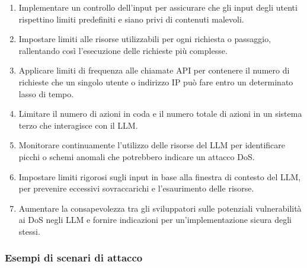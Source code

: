 \documentclass[
]{article}
\providecommand{\tightlist}{%
  \setlength{\itemsep}{0pt}\setlength{\parskip}{0pt}}
\begin{document}
\begin{enumerate}
\def\labelenumi{\arabic{enumi}.}
\tightlist
\item
  Implementare un controllo dell'input per assicurare che gli input
  degli utenti rispettino limiti predefiniti e siano privi di contenuti
  malevoli.
\item
  Impostare limiti alle risorse utilizzabili per ogni richiesta o
  passaggio, rallentando così l'esecuzione delle richieste più
  complesse.
\item
  Applicare limiti di frequenza alle chiamate API per contenere il
  numero di richieste che un singolo utente o indirizzo IP può fare
  entro un determinato lasso di tempo.
\item
  Limitare il numero di azioni in coda e il numero totale di azioni in
  un sistema terzo che interagisce con il LLM.
\item
  Monitorare continuamente l'utilizzo delle risorse del LLM per
  identificare picchi o schemi anomali che potrebbero indicare un
  attacco DoS.
\item
  Impostare limiti rigorosi sugli input in base alla finestra di
  contesto del LLM, per prevenire eccessivi sovraccarichi e
  l'esaurimento delle risorse.
\item
  Aumentare la consapevolezza tra gli sviluppatori sulle potenziali
  vulnerabilità ai DoS negli LLM e fornire indicazioni per
  un'implementazione sicura degli stessi.
\end{enumerate}

\subsubsection{Esempi di scenari di
attacco}\label{esempi-di-scenari-di-attacco}
\end{document}
